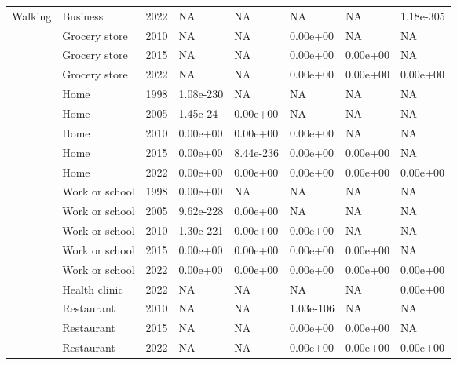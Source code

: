 \documentclass[preprint, 3p,
authoryear]{elsarticle} %
\begin{document}
\begin{table}
{\begin{tabular}[t]{llllllll}
\multirow[t]{-34}{*}{\raggedright\arraybackslash Walking} & Business & 2022 & NA & NA & NA & NA & 1.18e-305\\
\cmidrule{1-8}
 & Grocery store & 2010 & NA & NA & 0.00e+00 & NA & NA\\

 & Grocery store & 2015 & NA & NA & 0.00e+00 & 0.00e+00 & NA\\

 & Grocery store & 2022 & NA & NA & 0.00e+00 & 0.00e+00 & 0.00e+00\\

 & Home & 1998 & 1.08e-230 & NA & NA & NA & NA\\

 & Home & 2005 & 1.45e-24 & 0.00e+00 & NA & NA & NA\\

 & Home & 2010 & 0.00e+00 & 0.00e+00 & 0.00e+00 & NA & NA\\

 & Home & 2015 & 0.00e+00 & 8.44e-236 & 0.00e+00 & 0.00e+00 & NA\\

 & Home & 2022 & 0.00e+00 & 0.00e+00 & 0.00e+00 & 0.00e+00 & 0.00e+00\\

 & Work or school & 1998 & 0.00e+00 & NA & NA & NA & NA\\

 & Work or school & 2005 & 9.62e-228 & 0.00e+00 & NA & NA & NA\\

 & Work or school & 2010 & 1.30e-221 & 0.00e+00 & 0.00e+00 & NA & NA\\

 & Work or school & 2015 & 0.00e+00 & 0.00e+00 & 0.00e+00 & 0.00e+00 & NA\\

 & Work or school & 2022 & 0.00e+00 & 0.00e+00 & 0.00e+00 & 0.00e+00 & 0.00e+00\\

 & Health clinic & 2022 & NA & NA & NA & NA & 0.00e+00\\

 & Restaurant & 2010 & NA & NA & 1.03e-106 & NA & NA\\

 & Restaurant & 2015 & NA & NA & 0.00e+00 & 0.00e+00 & NA\\

 & Restaurant & 2022 & NA & NA & 0.00e+00 & 0.00e+00 & 0.00e+00\\


\end{tabular}}
\end{table}
\end{document}
